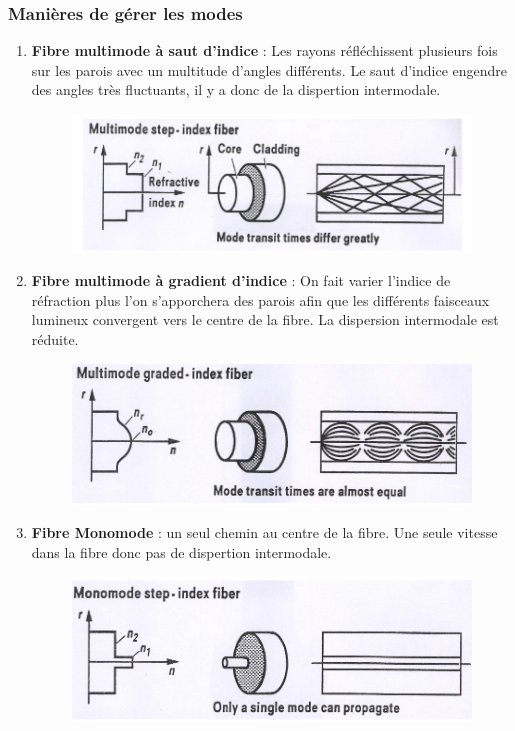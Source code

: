 		\subsubsection{Manières de gérer les modes}
			\begin{enumerate}
				 \item \textbf{Fibre multimode à saut d'indice} : Les rayons réfléchissent plusieurs fois sur les parois avec un multitude d'angles différents. Le saut d'indice engendre des angles très fluctuants, il y a donc de la dispertion intermodale.
				 \begin{figure}[H]
				 	\centering
				 	\includegraphics[width=\textwidth]{img/multimode.png}
				 \end{figure}
				 
				 \item \textbf{Fibre multimode à gradient d'indice} : On fait varier l'indice de réfraction plus l'on s'apporchera des parois afin que les différents faisceaux lumineux convergent vers le centre de la fibre. La dispersion intermodale est réduite.
				 
				 \begin{figure}[H]
				 	\centering
				 	\includegraphics[width=\textwidth]{img/multimode2.png}
				 \end{figure}
				 
				 \item \textbf{Fibre Monomode} : un seul chemin au centre de la fibre. Une seule vitesse dans la fibre donc pas de dispertion intermodale.
				 
				 \begin{figure}[H]
				 	\centering
				 	\includegraphics[width=\textwidth]{img/multimode3.png}
				 \end{figure}
			\end{enumerate}
			
